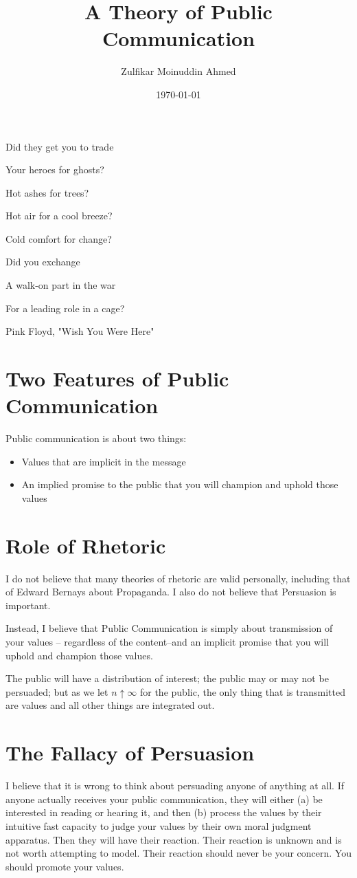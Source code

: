 \documentclass{amsart}
\title{A Theory of Public Communication}
\author{Zulfikar Moinuddin Ahmed}
\date{\today}
\begin{document}
\maketitle
\epigraph{Did they get you to trade

Your heroes for ghosts?

Hot ashes for trees?

Hot air for a cool breeze?

Cold comfort for change?

Did you exchange

A walk-on part in the war

For a leading role in a cage?}{Pink Floyd, "Wish You Were Here"}

\section{Two Features of Public Communication}

Public communication is about two things:
\begin{itemize}
\item Values that are implicit in the message
\item An implied promise to the public that you will champion and uphold those values
\end{itemize}

\section{Role of Rhetoric}

I do not believe that many theories of rhetoric are valid personally, including that of Edward Bernays about Propaganda.  I also do not believe that Persuasion is important.

Instead, I believe that Public Communication is simply about transmission of your values -- regardless of the content--and an implicit promise that you will uphold and champion those values.

The public will have a distribution of interest; the public may or may not be persuaded; but as we let $n\uparrow\infty$ for the public, the only thing that is transmitted are values and all other things are integrated out.

\section{The Fallacy of Persuasion}

I believe that it is wrong to think about persuading anyone of anything at all.  If anyone actually receives your public communication, they will either (a) be interested in reading or hearing it, and then (b) process the values by their intuitive fast capacity to judge your values by their own moral judgment apparatus.  Then they will have their reaction.  Their reaction is unknown and is not worth attempting to model.  Their reaction should never be your concern.  You should promote your values.
\end{document}
